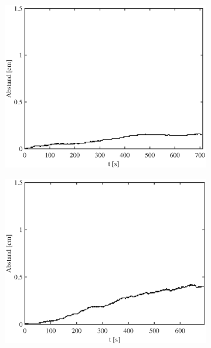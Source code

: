 \documentclass[doc,a4paper,12pt]{apa6}
\begin{document}
\begin{figure}
\begin{subfigure}[c]{0.23\textwidth}
    \label{img:bewegung:pa07:3}
  \end{subfigure}\hspace*{0.02\textwidth}
  \begin{subfigure}[c]{0.23\textwidth}
    \includegraphics[width=\textwidth]{ergebnisse/pa07/pa07a4_mc_dist_movement.eps}
    \label{img:bewegung:pa07:4}
  \end{subfigure}\hspace*{0.02\textwidth}
  \begin{subfigure}[c]{0.23\textwidth}
    \includegraphics[width=\textwidth]{ergebnisse/pa07/pa07a6_mc_dist_movement.eps}

\end{subfigure}
\end{figure}
\end{document}
